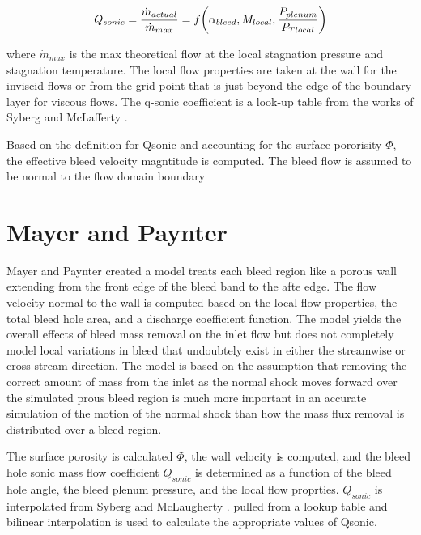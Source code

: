 \documentclass{article}
\begin{document}
$$ Q_{sonic} = \frac{\dot{m}_{actual}}{\dot{m}_{max}} = f\qty(\alpha_{bleed},M_{local},\dfrac{P_{plenum}}{P_{Tlocal}}) $$

where $\dot{m}_{max}$ is the max theoretical flow at the local stagnation pressure and stagnation temperature. The local flow properties are taken at the wall for the inviscid flows or from the grid point that is just beyond the edge of the boundary layer for viscous flows. The q-sonic coefficient is a look-up table from the works of Syberg \cite{Syberg1973} and McLafferty \cite{McLafferty1958}.

Based on the definition for Qsonic and accounting for the surface pororisity $\Phi$, the effective bleed velocity magntitude is computed. The bleed flow is assumed to be normal to the flow domain boundary


\section{Mayer and Paynter}

Mayer and Paynter \cite{Mayer1994} created a model treats each bleed region like a porous wall extending from the front edge of the bleed band to the afte edge. The flow velocity normal to the wall is computed based on the local flow properties, the total bleed hole area, and a discharge coefficient function. The model yields the overall effects of bleed mass removal on the inlet flow but does not completely model local variations in bleed that undoubtely exist in either the streamwise or cross-stream direction. The model is based on the assumption that removing the correct amount of mass from the inlet as the normal shock moves forward over the simulated prous bleed region is much more important in an accurate simulation of the motion of the normal shock than how the mass flux removal is distributed over a bleed region.

The surface porosity is calculated $\Phi$, the wall velocity is computed, and the bleed hole sonic mass flow coefficient $Q_{sonic}$ is determined as a function of the bleed hole angle, the bleed plenum pressure, and the local flow proprties. $Q_{sonic}$ is interpolated from Syberg \cite{Syberg1973} and McLaugherty \cite{McLafferty1958}. pulled from a lookup table and bilinear interpolation is used to calculate the appropriate values of Qsonic.
\end{document}
